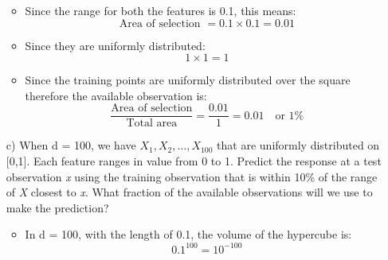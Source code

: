 \documentclass{article}
\begin{document}
\begin{enumerate}
    \begin{itemize}
        \item Since the range for both the features is 0.1, this means:
        \[
        \text{Area of selection } = 0.1 \times 0.1 = 0.01
        \]

        \item Since they are uniformly distributed:
        \[1 \times 1 = 1\]

        \item Since the training points are uniformly distributed over the square therefore the 
        available observation is:
        \[
        \frac{\text{Area of selection}}{\text{Total area}} = \frac{0.01}{1} = 0.01 \quad \text{or 1\%}
        \]
  \end{itemize}

  \item [c)] When d = 100, we have $X_1, X_2, \ldots, X_{100}$ that are uniformly distributed on [0,1]. Each feature ranges in value from 0 to 1.
    Predict the response at a test observation \textit{x} using the training observation that is within 10\% of the range of \textit{X} closest to \textit{x}.
    What fraction of the available observations will we use to make the prediction?

    \begin{itemize}
        \item In d = 100, with the length of 0.1, the volume of the hypercube is:
        \[
        0.1^{100} = 10^{-100}   
        \]
    \end{itemize}



\end{enumerate}
\end{document}

